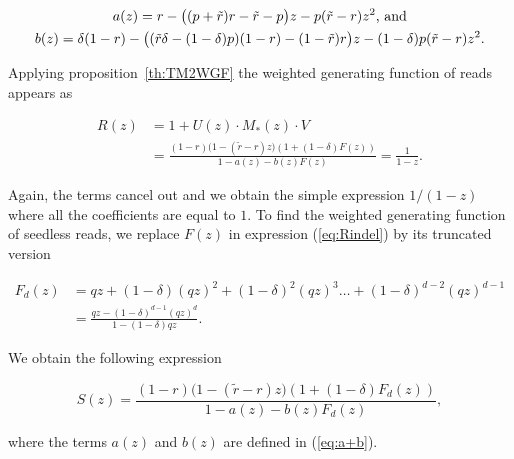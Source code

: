 \documentclass{article}
\begin{document}
\begin{gather}
\label{eq:a+b}
a(z) = r-\big((p+\tilde{r})r-\tilde{r}-p\big)z
- p(\tilde{r}-r)z^2\text{, and} \\
b(z) = \delta(1-r) - \big((\tilde{r}\delta-(1-\delta)p)(1-r)
-(1-\tilde{r})r\big)z -(1-\delta)p(\tilde{r}-r)z^2.
\notag
\end{gather}

Applying proposition~\ref{th:TM2WGF} the weighted generating function of
reads appears as

\begin{equation}
\label{eq:Rindel}
\begin{split}
R(z) &= 1 + U(z) \cdot M_*(z) \cdot V \\
&= \frac{(1-r)\big( 1-(\tilde{r}-r)z \big)
\left(1+(1-\delta)F(z) \right)}{1-a(z)-b(z)F(z)}
= \frac{1}{1-z}.
\end{split}
\end{equation}

Again, the terms cancel out and we obtain the simple expression
$1/(1-z)$ where all the coefficients are equal to $1$. To find the
weighted generating function of seedless reads, we replace $F(z)$ in
expression (\ref{eq:Rindel}) by its truncated version

\begin{equation*}
\begin{split}
F_d(z) &= qz + (1-\delta)(qz)^2 + (1-\delta)^2(qz)^3 \ldots +
(1-\delta)^{d-2}(qz)^{d-1} \\
&= \frac{qz-(1-\delta)^{d-1}(qz)^d}{1-(1-\delta)qz}.
\end{split}
\end{equation*}

We obtain the following expression

\begin{equation}
\label{eq:Sindel}
S(z) = \frac{(1-r)\big( 1-(\tilde{r}-r)z \big) \left(1+(1-\delta)F_d(z)
\right)}{1-a(z)-b(z)F_d(z)},
\end{equation}

\noindent
where the terms $a(z)$ and $b(z)$ are defined in (\ref{eq:a+b}).
\end{document}
